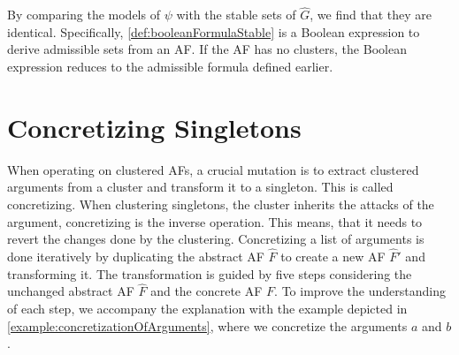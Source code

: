 By comparing the models of $\psi$ with the stable sets of $\hat{G}$, we find that they are identical. Specifically, \cref{def:booleanFormulaStable} is a Boolean expression to derive admissible sets from an AF. If the AF has no clusters, the Boolean expression reduces to the admissible formula defined earlier.


\section{Concretizing Singletons}
\label{sec:ConcretizingSingletons}
When operating on clustered AFs, a crucial mutation is to extract clustered arguments from a cluster and transform it to a singleton. This is called concretizing. When clustering singletons, the cluster inherits the attacks of the argument, concretizing is the inverse operation. This means, that it needs to revert the changes done by the clustering.
Concretizing a list of arguments is done iteratively by duplicating the abstract AF $\hat{F}$ to create a new AF $\hat{F}'$ and transforming it. The transformation is guided by five steps considering the unchanged abstract AF $\hat{F}$ and the concrete AF $F$. To improve the understanding of each step, we accompany the explanation with the example depicted in \cref{example:concretizationOfArguments}, where we concretize the arguments $a$ and $b$.

\vspace{0.3cm}

